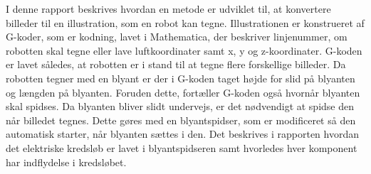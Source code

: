 \documentclass[11pt]{article}
\begin{document}
\setlength{\baselineskip}{1.41\baselineskip}
\parindent=10pt
\parskip=2.6mm


I denne rapport beskrives hvordan en metode er udviklet til, at konvertere billeder til en illustration, som en robot kan tegne.  Illustrationen er konstrueret af G-koder, som er kodning, lavet i Mathematica, der beskriver linjenummer, om robotten skal tegne eller lave luftkoordinater samt x, y og z-koordinater. G-koden er lavet således, at robotten er i stand til at tegne flere forskellige billeder. Da robotten tegner med en blyant er der i G-koden taget højde for slid på blyanten og længden på blyanten. Foruden dette, fortæller G-koden også hvornår blyanten skal spidses. Da blyanten bliver slidt undervejs, er det nødvendigt at spidse den når billedet tegnes. Dette gøres med en blyantspidser, som er modificeret så den automatisk starter, når blyanten sættes i den. Det beskrives i rapporten hvordan det elektriske kredsløb er lavet i blyantspidseren samt hvorledes hver komponent har indflydelse i kredsløbet. 
\end{document}
